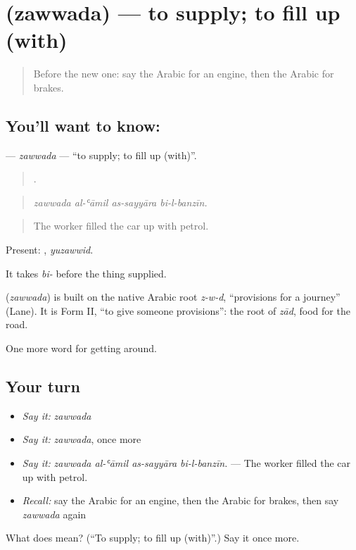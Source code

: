 \section[\texorpdfstring{\ar{زود} (zawwada)}{زود (zawwada)}]{ (zawwada) — to supply; to fill up (with)}

\label{lesson:AR-C432-zawwada}



\begin{quote}
Before the new one: say the Arabic for an engine, then the Arabic for brakes.
\end{quote}

\subsection*{You'll want to know: }
\textbf{} — \emph{zawwada} — \textquotedblleft{}to supply; to fill up (with)\textquotedblright{}.

\begin{quote}
   .
\end{quote}

\begin{quote}
\emph{zawwada al-ʿāmil as-sayyāra bi-l-banzīn.}
\end{quote}

\begin{quote}
The worker filled the car up with petrol.
\end{quote}

Present: , \emph{yuzawwid}.

It takes \emph{bi-} before the thing supplied.

\begin{cousinweb}
\textbf{} (\emph{zawwada}) is built on the native Arabic root \emph{z-w-d}, \textquotedblleft{}provisions for a journey\textquotedblright{} (Lane). It is Form II, \textquotedblleft{}to give someone provisions\textquotedblright{}: the root of \emph{zād}, food for the road.
\end{cousinweb}

\begin{grammarlens}[title={What you've built}]
One more word for getting around.
\end{grammarlens}

\subsection*{Your turn}
\begin{itemize}
\raggedright
  \item \emph{Say it:} \emph{zawwada}
  \item \emph{Say it:} \emph{zawwada}, once more
  \item \emph{Say it:} \emph{zawwada al-ʿāmil as-sayyāra bi-l-banzīn.} — The worker filled the car up with petrol.
  \item \emph{Recall:} say the Arabic for an engine, then the Arabic for brakes, then say \emph{zawwada} again
\end{itemize}

\begin{tcolorbox}[breakable,colback=teal!4,colframe=teal!35!black,title={Before you move on}]
What does  mean? (\textquotedblleft{}To supply; to fill up (with)\textquotedblright{}.) Say it once more.
\end{tcolorbox}
